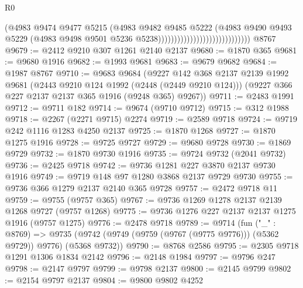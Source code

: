 \begin{lexlean}{R0}
\begin{coremodule}
                                                      (@4983
                                                        @9474
                                                        @9477
                                                        @5215
                                                        (@4983
                                                          @9482
                                                          @9485
                                                          @5222
                                                          (@4983
                                                            @9490
                                                            @9493
                                                            @5229
                                                            (@4983
                                                              @9498
                                                              @9501
                                                              @5236
                                                              @5238)))))))))))))))))))))))))))))
    @8767
@9679 := @2412 @9210 @307 @1261 @2140 @2137
@9680 := @1870 @365
@9681 := @9680 @1916
@9682 := @1993 @9681
@9683 := @9679 @9682
@9684 := @1987 @8767
@9710 := @9683
    @9684
    (@9227
      @142
      @368
      @2137
      @2139
      @1992
      @9681
      (@2443 @9210 @124 @1992 (@2448 (@2449 @9210 @124)))
      (@9227 @366 @227 @2137 @2137 @365 @1916 (@9248 @365) @9267))
@9711 := @2483 @1991
@9712 := @9711 @182
@9714 := @9674 (@9710 @9712)
@9715 := @312 @1988
@9718 := @2267 (@2271 @9715) @2274
@9719 := @2589 @9718
@9724 := @9719 @242 @1116 @1283 @4250 @2137
@9725 := @1870 @1268
@9727 := @1870 @1275 @1916
@9728 := @9725 @9727
@9729 := @9680 @9728
@9730 := @1869 @9729
@9732 := @1870 @9730 @1916
@9735 := @9724 @9732 (@2041 @9732)
@9736 := @2425 @9718
@9742 := @9736 @1281 @227 @3870 @2137 @9730 @1916
@9749 := @9719 @148 @97 @1280 @3868 @2137 @9729 @9730
@9755 := @9736 @366 @1279 @2137 @2140 @365 @9728
@9757 := @2472 @9718 @11
@9759 := @9755 (@9757 @365)
@9767 := @9736 @1269 @1278 @2137 @2139 @1268 @9727 (@9757 @1268)
@9775 := @9736 @1276 @227 @2137 @2137 @1275 @1916 (@9757 @1275)
@9776 := @2478 @9718
@9789 := @9714
    (fun ("_" : @8769) =>
    @9735 (@9742 (@9749 (@9759 (@9767 (@9775 @9776))) (@5362 @9729)) @9776) (@5368 @9732))
@9790 := @8768 @2586
@9795 := @2305 @9718 @1291 @1306 @1834 @2142
@9796 := @2148 @1984
@9797 := @9796 @247
@9798 := @2147 @9797
@9799 := @9798 @2137
@9800 := @2145 @9799
@9802 := @2154 @9797 @2137
@9804 := @9800 @9802 @4252

\end{coremodule}
\end{lexlean}
